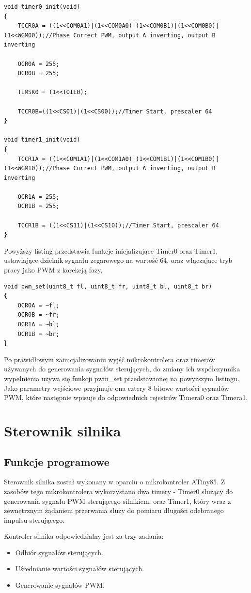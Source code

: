 \begin{lstlisting}
void timer0_init(void)
{
	TCCR0A = ((1<<COM0A1)|(1<<COM0A0)|(1<<COM0B1)|(1<<COM0B0)|(1<<WGM00));//Phase Correct PWM, output A inverting, output B inverting

	OCR0A = 255;
	OCR0B = 255;

	TIMSK0 = (1<<TOIE0);

	TCCR0B=((1<<CS01)|(1<<CS00));//Timer Start, prescaler 64
}

void timer1_init(void)
{
	TCCR1A = ((1<<COM1A1)|(1<<COM1A0)|(1<<COM1B1)|(1<<COM1B0)|(1<<WGM10));//Phase Correct PWM, output A inverting, output B inverting

	OCR1A = 255;
	OCR1B = 255;

	TCCR1B = ((1<<CS11)|(1<<CS10));//Timer Start, prescaler 64
}
\end{lstlisting}

Powyższy listing przedstawia funkcje inicjalizujące Timer0 oraz Timer1, ustawiające dzielnik sygnału zegarowego na wartość 64, oraz włączające tryb pracy jako PWM z korekcją fazy.

\begin{lstlisting}
void pwm_set(uint8_t fl, uint8_t fr, uint8_t bl, uint8_t br)
{
	OCR0A = ~fl;
	OCR0B = ~fr;
	OCR1A = ~bl;
	OCR1B = ~br;
}
\end{lstlisting}

Po prawidłowym zainicjalizowaniu wyjść mikrokontrolera oraz timerów używanych do generowania sygnałów sterujących, do zmiany ich współczynnika wypełnienia używa się funkcji pwm\_set przedstawionej na powyższym listingu. Jako parametry wejściowe przyjmuje ona cztery 8-bitowe wartości sygnałów PWM, które następnie wpisuje do odpowiednich rejestrów Timera0 oraz Timera1.

\section{Sterownik silnika}
\subsection{Funkcje programowe}
Sterownik silnika został wykonany w oparciu o mikrokontroler ATiny85. Z zasobów tego mikrokontrolera wykorzystano dwa timery - Timer0 służący do generowania sygnału PWM sterującego silnikiem, oraz Timer1, który wraz z zewnętrznym żądaniem przerwania służy do pomiaru długości odebranego impulsu sterującego.

Kontroler silnika odpowiedzialny jest za trzy zadania:
\begin{itemize}
	\item Odbiór sygnałów sterujących.
	\item Uśrednianie wartości sygnałów sterujących.
	\item Generowanie sygnałów PWM.
\end{itemize}

